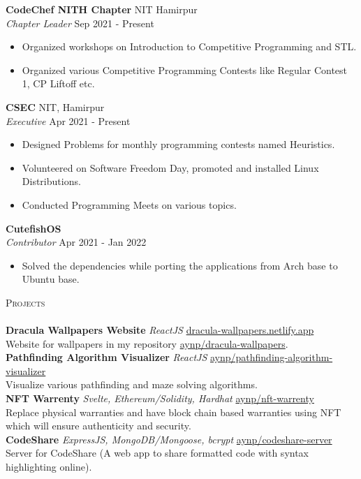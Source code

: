 \documentclass[a4paper]{article}
\newcommand{\lineunder} {
    \vspace*{-8pt} \\
    \hspace*{-18pt} \hrulefill \\
}
\newcommand{\header} [1] {
    {\hspace*{-18pt}\vspace*{6pt} \textsc{#1}}
    \vspace*{-6pt} \lineunder
}
\begin{document}
\textbf{CodeChef NITH Chapter} \hfill NIT Hamirpur\\
\textit{Chapter Leader} \hfill Sep 2021 - Present\\
\vspace{-1mm}
\begin{itemize} \itemsep 1pt
	\item Organized workshops on Introduction to Competitive Programming and STL.
	\item Organized various Competitive Programming Contests like Regular Contest 1, CP Liftoff etc.
\end{itemize}
\textbf{CSEC} \hfill NIT, Hamirpur\\
\textit{Executive} \hfill Apr 2021 - Present\\
\vspace{-1mm}
\begin{itemize} \itemsep 1pt
	\item Designed Problems for monthly programming contests named Heuristics.
	\item Volunteered on Software Freedom Day, promoted and installed Linux Distributions.
	\item Conducted Programming Meets on various topics.
\end{itemize}
\textbf{CutefishOS}\\
\textit{Contributor} \hfill Apr 2021 - Jan 2022\\
\vspace{-1mm}
\begin{itemize} \itemsep 1pt
	\item Solved the dependencies while porting the applications from Arch base to Ubuntu base.
\end{itemize}

\header{Projects}
{\textbf{Dracula Wallpapers Website}} {\sl ReactJS} \hfill \href{https://dracula-wallpapers.netlify.app/}{dracula-wallpapers.netlify.app}\\
Website for wallpapers in my repository \href{https://github.com/aynp/dracula-wallpapers}{aynp/dracula-wallpapers}.\\
\vspace*{2mm}
{\textbf{Pathfinding Algorithm Visualizer}} {\sl ReactJS} \hfill \href{https://github.com/aynp/pathfinding-algorithm-visualizer}{aynp/pathfinding-algorithm-visualizer}\\
Visualize various pathfinding and maze solving algorithms.\\
\vspace*{2mm}
{\textbf{NFT Warrenty}} {\sl Svelte, Ethereum/Solidity, Hardhat} \hfill \href{https://github.com/aynp/nft-warrenty}{aynp/nft-warrenty}\\
Replace physical warranties and have block chain based warranties using NFT which will ensure authenticity and security.\\
\vspace*{2mm}
{\textbf{CodeShare}} {\sl ExpressJS, MongoDB/Mongoose, bcrypt} \hfill \href{https://github.com/aynp/codeshare-server}{aynp/codeshare-server}\\
Server for CodeShare (A web app to share formatted code with syntax highlighting online).\\
\vspace*{2mm}
\end{document}

